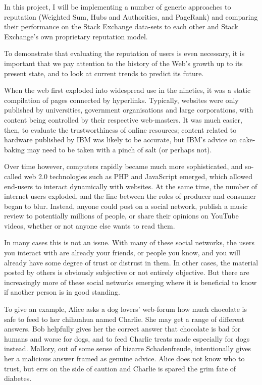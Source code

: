 \documentclass[]{final_report}
\begin{document}
In this project, I will be implementing a number of generic approaches to reputation (Weighted Sum, Hubs and Authorities, and PageRank) and comparing their performance on the Stack Exchange data-sets to each other and Stack Exchange's own proprietary reputation model.

To demonstrate that evaluating the reputation of users is even necessary, it is important that we pay attention to the history of the Web's growth up to its present state, and to look at current trends to predict its future.

When the web first exploded into widespread use in the nineties, it was a static compilation of pages connected by hyperlinks. Typically, websites were only published by universities, government organisations and large corporations, with content being controlled by their respective web-masters. It was much easier, then, to evaluate the trustworthiness of online resources; content related to hardware published by IBM was likely to be accurate, but IBM's advice on cake-baking may need to be taken with a pinch of salt (or perhaps not).

Over time however, computers rapidly became much more sophisticated, and so-called web 2.0 technologies such as PHP and JavaScript emerged, which allowed end-users to interact dynamically with websites. At the same time, the number of internet users exploded, and the line between the roles of producer and consumer began to blur. Instead, anyone could post on a social network, publish a music review to potentially millions of people, or share their opinions on YouTube videos, whether or not anyone else wants to read them.

In many cases this is not an issue. With many of these social networks, the users you interact with are already your friends, or people you know, and you will already have some degree of trust or distrust in them. In other cases, the material posted by others is obviously subjective or not entirely objective. But there are increasingly more of these social networks emerging where it is beneficial to know if another person is in good standing.

To give an example, Alice asks a dog lovers' web-forum how much chocolate is safe to feed to her chihuahua named Charlie. She may get a range of different answers. Bob helpfully gives her the correct answer that chocolate is bad for humans and worse for dogs, and to feed Charlie treats made especially for dogs instead. Mallory, out of some sense of bizarre Schadenfreude, intentionally gives her a malicious answer framed as genuine advice. Alice does not know who to trust, but errs on the side of caution and Charlie is spared the grim fate of diabetes.
\end{document}
